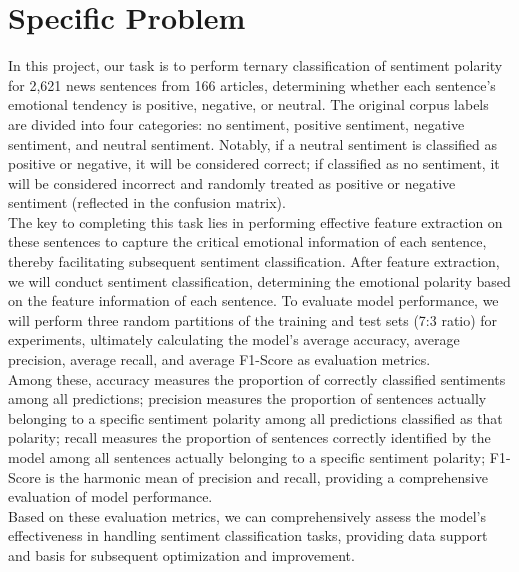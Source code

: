 \section{Specific Problem}
\indent In this project, our task is to perform ternary classification of sentiment polarity for 2,621 news sentences from 166 articles, determining whether each sentence's emotional tendency is positive, negative, or neutral. The original corpus labels are divided into four categories: no sentiment, positive sentiment, negative sentiment, and neutral sentiment. Notably, if a neutral sentiment is classified as positive or negative, it will be considered correct; if classified as no sentiment, it will be considered incorrect and randomly treated as positive or negative sentiment (reflected in the confusion matrix).\\
\indent The key to completing this task lies in performing effective feature extraction on these sentences to capture the critical emotional information of each sentence, thereby facilitating subsequent sentiment classification. After feature extraction, we will conduct sentiment classification, determining the emotional polarity based on the feature information of each sentence. To evaluate model performance, we will perform three random partitions of the training and test sets (7:3 ratio) for experiments, ultimately calculating the model's average accuracy, average precision, average recall, and average F1-Score as evaluation metrics.\\
\indent Among these, accuracy measures the proportion of correctly classified sentiments among all predictions; precision measures the proportion of sentences actually belonging to a specific sentiment polarity among all predictions classified as that polarity; recall measures the proportion of sentences correctly identified by the model among all sentences actually belonging to a specific sentiment polarity; F1-Score is the harmonic mean of precision and recall, providing a comprehensive evaluation of model performance.\\
\indent Based on these evaluation metrics, we can comprehensively assess the model's effectiveness in handling sentiment classification tasks, providing data support and basis for subsequent optimization and improvement.